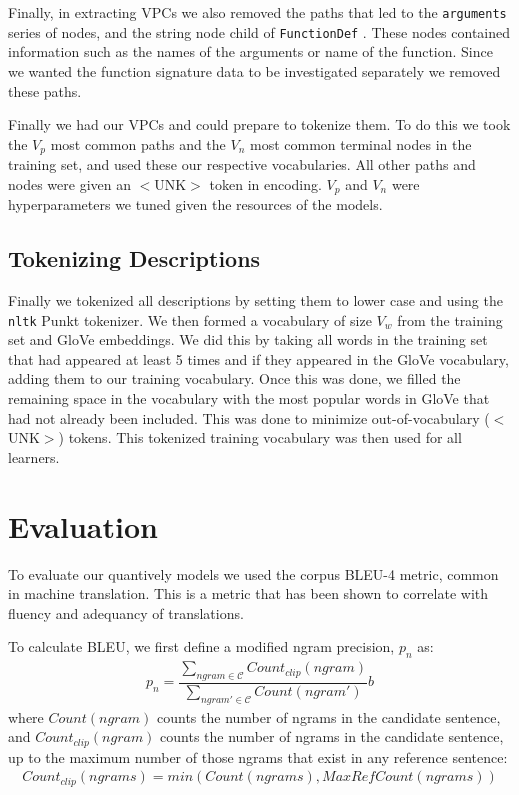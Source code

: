 Finally, in extracting VPCs we also removed the paths that led to the \texttt{arguments} series of nodes, and the string node child of \texttt{FunctionDef} . These nodes contained information such as the names of the arguments or name of the function. Since we wanted the function signature data to be investigated separately we removed these paths. 

Finally we had our VPCs and could prepare to tokenize them. To do this we took the $V_p$ most common paths and the $V_n$ most common terminal nodes in the training set, and used these our respective vocabularies.  All other paths and nodes were given an $<$UNK$>$ token in encoding. $V_p$ and $V_n$ were hyperparameters we tuned given the resources of the models.

\subsection{Tokenizing Descriptions}

Finally we tokenized all descriptions by setting them to lower case and using the \texttt{nltk} \cite{bird_natural_2009} Punkt \cite{Kiss:2006:UMS:1245119.1245122}tokenizer. We then formed a vocabulary of size $V_w$ from the training set and GloVe embeddings. We did this by taking all words in the training set that had appeared at least 5 times and if they appeared in the GloVe vocabulary, adding them to our training vocabulary. Once this was done, we filled the remaining space in the vocabulary with the most popular words in GloVe that had not already been included. This was done to minimize out-of-vocabulary ($<$UNK$>$) tokens. This tokenized training vocabulary was then used for all learners.

\section{Evaluation}

To evaluate our quantively models we used the corpus BLEU-4 metric\cite{papineni_bleu_2001}, common in machine translation. This is a metric that has been shown to correlate with fluency and adequancy of translations. 

To calculate BLEU, we first define a modified ngram precision, $p_n$ as:
\begin{align}
    p_n = \dfrac{\sum_{ngram \in \mathcal{C}} Count_{clip}(ngram)}{\sum_{ngram' \in \mathcal{C}} Count(ngram')} \nonumber b
\end{align}
where $Count(ngram)$ counts the number of ngrams in the candidate sentence, and  $Count_{clip}(ngram)$ counts the number of ngrams in the candidate sentence, up to the maximum number of those ngrams that exist in any reference sentence:
\begin{align}
Count_{clip}(ngrams) = min(Count(ngrams),MaxRefCount(ngrams)) \nonumber
\end{align}

